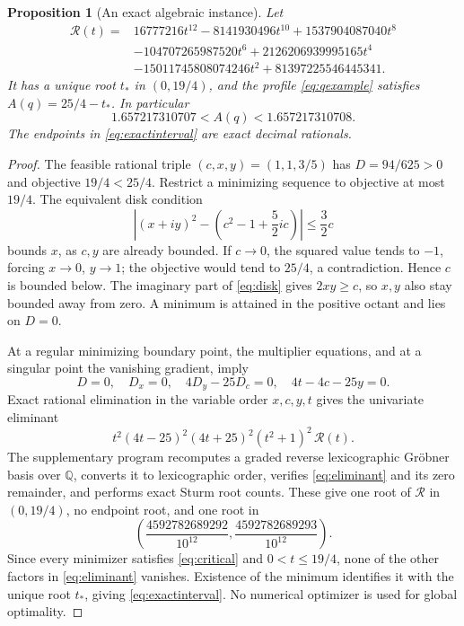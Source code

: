 \documentclass[11pt,a4paper]{article}
\newtheorem{proposition}[theorem]{Proposition}
\theoremstyle{remark}\newtheorem{remark}[theorem]{Remark}
\begin{document}
\begin{proposition}[An exact algebraic instance]\label{prop:example}
Let
\begin{align*}
 \mathcal R(t)={}&16777216t^{12}-8141930496t^{10}
       +1537904087040t^8\\
 &-104707265987520t^6+2126206939995165t^4\\
 &-15011745808074246t^2+81397225546445341.
\end{align*}
It has a unique root \(t_*\) in \((0,19/4)\), and the profile
\eqref{eq:qexample} satisfies \(A(q)=25/4-t_*\). In particular
\begin{equation}\label{eq:exactinterval}
 1.657217310707<A(q)<1.657217310708.
\end{equation}
The endpoints in \eqref{eq:exactinterval} are exact decimal rationals.
\end{proposition}
\begin{proof}
The feasible rational triple \((c,x,y)=(1,1,3/5)\) has
\(D=94/625>0\) and objective \(19/4<25/4\).
Restrict a minimizing sequence to objective at most \(19/4\).
The equivalent disk condition
\begin{equation}\label{eq:disk}
 \left|(x+iy)^2-\left(c^2-1+\frac52ic\right)\right|
 \leq\frac32c
\end{equation}
bounds \(x\), as \(c,y\) are already bounded.
If \(c\to0\), the squared value tends to \(-1\), forcing
\(x\to0\), \(y\to1\); the objective would tend to \(25/4\),
a contradiction. Hence \(c\) is bounded below.
The imaginary part of \eqref{eq:disk} gives \(2xy\geq c\),
so \(x,y\) also stay bounded away from zero.
A minimum is attained in the positive octant and lies on \(D=0\).

At a regular minimizing boundary point, the multiplier equations,
and at a singular point the vanishing gradient, imply
\begin{equation}\label{eq:critical}
 D=0,\quad D_x=0,\quad 4D_y-25D_c=0,\quad 4t-4c-25y=0.
\end{equation}
Exact rational elimination in the variable order \(x,c,y,t\)
gives the univariate eliminant
\begin{equation}\label{eq:eliminant}
 t^2(4t-25)^2(4t+25)^2(t^2+1)^2\,\mathcal R(t).
\end{equation}
The supplementary program recomputes a graded reverse lexicographic
Gr\"obner basis over \(\mathbb Q\), converts it to lexicographic order,
verifies \eqref{eq:eliminant} and its zero remainder, and performs
exact Sturm root counts. These give one root of \(\mathcal R\)
in \((0,19/4)\), no endpoint root, and one root in
\[
 \left(\frac{4592782689292}{10^{12}},
             \frac{4592782689293}{10^{12}}\right).
\]
Since every minimizer satisfies \eqref{eq:critical} and
\(0<t\leq19/4\), none of the other factors in
\eqref{eq:eliminant} vanishes. Existence of the minimum identifies
it with the unique root \(t_*\), giving \eqref{eq:exactinterval}.
No numerical optimizer is used for global optimality.
\end{proof}
\end{document}
